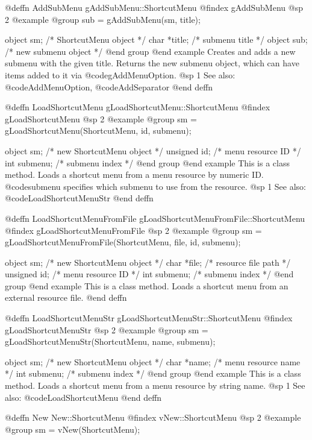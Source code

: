 @deffn {AddSubMenu} gAddSubMenu::ShortcutMenu
@findex gAddSubMenu
@sp 2
@example
@group
sub = gAddSubMenu(sm, title);

object  sm;      /*  ShortcutMenu object          */
char    *title;  /*  submenu title                 */
object  sub;     /*  new submenu object            */
@end group
@end example
Creates and adds a new submenu with the given title.  Returns the new
submenu object, which can have items added to it via
@code{gAddMenuOption}.
@sp 1
See also:  @code{AddMenuOption}, @code{AddSeparator}
@end deffn



@deffn {LoadShortcutMenu} gLoadShortcutMenu::ShortcutMenu
@findex gLoadShortcutMenu
@sp 2
@example
@group
sm = gLoadShortcutMenu(ShortcutMenu, id, submenu);

object    sm;        /*  new ShortcutMenu object   */
unsigned  id;        /*  menu resource ID           */
int       submenu;   /*  submenu index              */
@end group
@end example
This is a class method.  Loads a shortcut menu from a menu resource by
numeric ID.  @code{submenu} specifies which submenu to use from the
resource.
@sp 1
See also:  @code{LoadShortcutMenuStr}
@end deffn



@deffn {LoadShortcutMenuFromFile} gLoadShortcutMenuFromFile::ShortcutMenu
@findex gLoadShortcutMenuFromFile
@sp 2
@example
@group
sm = gLoadShortcutMenuFromFile(ShortcutMenu, file, id, submenu);

object    sm;        /*  new ShortcutMenu object   */
char      *file;     /*  resource file path         */
unsigned  id;        /*  menu resource ID           */
int       submenu;   /*  submenu index              */
@end group
@end example
This is a class method.  Loads a shortcut menu from an external resource
file.
@end deffn



@deffn {LoadShortcutMenuStr} gLoadShortcutMenuStr::ShortcutMenu
@findex gLoadShortcutMenuStr
@sp 2
@example
@group
sm = gLoadShortcutMenuStr(ShortcutMenu, name, submenu);

object  sm;        /*  new ShortcutMenu object   */
char    *name;     /*  menu resource name         */
int     submenu;   /*  submenu index              */
@end group
@end example
This is a class method.  Loads a shortcut menu from a menu resource by
string name.
@sp 1
See also:  @code{LoadShortcutMenu}
@end deffn



@deffn {New} New::ShortcutMenu
@findex vNew::ShortcutMenu
@sp 2
@example
@group
sm = vNew(ShortcutMenu);

